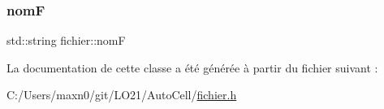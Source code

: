 \subsubsection{\texorpdfstring{nomF}{nomF}}
{\footnotesize\ttfamily std\+::string fichier\+::nomF\hspace{0.3cm}{\ttfamily [protected]}}



La documentation de cette classe a été générée à partir du fichier suivant \+:\begin{DoxyCompactItemize}
\item 
C\+:/\+Users/maxn0/git/\+L\+O21/\+Auto\+Cell/\mbox{\hyperlink{fichier_8h}{fichier.\+h}}\end{DoxyCompactItemize}
